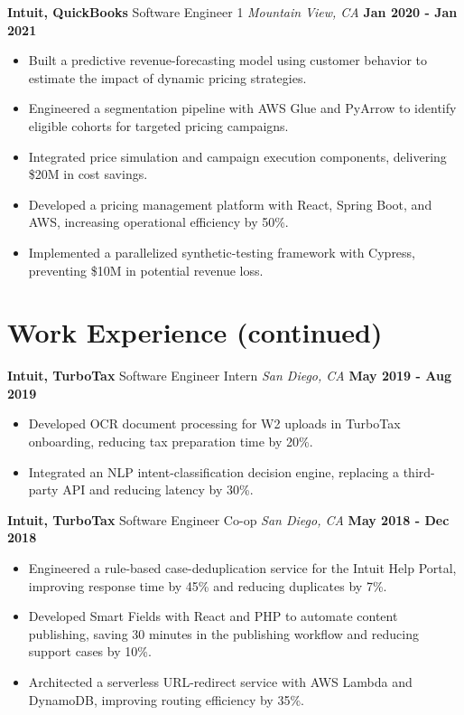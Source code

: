 \documentclass[10pt, letterpaper]{article}
\newcommand{\jobentry}[4]{
  \noindent\textbf{#1} \hfill #2 \hfill \textit{#3} \hfill \textbf{#4}
}
\begin{document}
\jobentry{Intuit, QuickBooks}{Software Engineer 1}{Mountain View, CA}{Jan 2020 - Jan 2021}
\begin{itemize}
\item Built a predictive revenue-forecasting model using customer behavior to estimate the impact of dynamic pricing strategies.
\item Engineered a segmentation pipeline with AWS Glue and PyArrow to identify eligible cohorts for targeted pricing campaigns.
\item Integrated price simulation and campaign execution components, delivering \$20M in cost savings.
\item Developed a pricing management platform with React, Spring Boot, and AWS, increasing operational efficiency by 50\%.
\item Implemented a parallelized synthetic-testing framework with Cypress, preventing \$10M in potential revenue loss.
\end{itemize}

\newpage
\section{Work Experience (continued)}

\jobentry{Intuit, TurboTax}{Software Engineer Intern}{San Diego, CA}{May 2019 - Aug 2019}
\begin{itemize}
\item Developed OCR document processing for W2 uploads in TurboTax onboarding, reducing tax preparation time by 20\%.
\item Integrated an NLP intent-classification decision engine, replacing a third-party API and reducing latency by 30\%.
\end{itemize}

\jobentry{Intuit, TurboTax}{Software Engineer Co-op}{San Diego, CA}{May 2018 - Dec 2018}
\begin{itemize}
\item Engineered a rule-based case-deduplication service for the Intuit Help Portal, improving response time by 45\% and reducing duplicates by 7\%.
\item Developed Smart Fields with React and PHP to automate content publishing, saving 30 minutes in the publishing workflow and reducing support cases by 10\%.
\item Architected a serverless URL-redirect service with AWS Lambda and DynamoDB, improving routing efficiency by 35\%.
\end{itemize}
\end{document}
